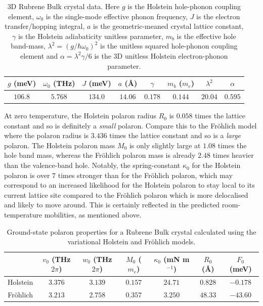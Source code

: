 \begin{table}
    \centering
    \begin{tabular}{|c|c|c|c|c|c|c|c|}
    \hline
        $g$ (meV) & $\omega_0$ (THz) & $J$ (meV) & $a$ (Å) & $\gamma$ & $m_b$ ($m_e$) & $\lambda^2$ & $\alpha$ \\
    \hline
         $106.8$ & $5.768$ & $134.0$ & $14.06$ & $0.178$ & $0.144$ & $20.04$ & $0.595$ \\
    \hline
    \end{tabular}
    \caption{3D Rubrene Bulk crystal data. Here $g$ is the Holstein hole-phonon coupling element, $\omega_0$ is the single-mode effective phonon frequency, $J$ is the electron transfer/hopping integral, $a$ is the geometric-meaned crystal lattice constant, $\gamma$ is the Holstein adiabaticity unitless parameter, $m_b$ is the effective hole band-mass, $\lambda^2 = (g / \hbar\omega_0)^2$ is the unitless squared hole-phonon coupling element and $\alpha = \lambda^2 \gamma / 6$ is the 3D unitless Holstein electron-phonon parameter.}
    \label{tab:rubrene}
\end{table}

At zero temperature, the Holstein polaron radius $R_0$ is $0.058$ times the lattice constant and so is definitely a \emph{small} polaron. Compare this to the Fr\"ohlich model where the polaron radius is $3.436$ times the lattice constant and so is a \emph{large} polaron. The Holstein polaron mass $M_0$ is only slightly large at $1.08$ times the hole band mass, whereas the Fr\"ohlich polaron mass is already $2.48$ times heavier than the valence-band hole. Notably, the spring-constant $\kappa_0$ for the Holstein polaron is over $7$ times stronger than for the Fr\"ohlich polaron, which may correspond to an increased likelihood for the Holstein polaron to stay local to its current lattice site compared to the Fr\"ohlich polaron which is more delocalised and likely to move around. This is certainly reflected in the predicted room-temperature mobilities, as mentioned above.

\begin{table}
    \centering
    \begin{tabular}{|c|c|c|c|c|c|c|}
    \hline
        & $v_0$ (THz$2\pi$) & $w_0$ (THz$2\pi$) & $M_0$ ($m_e$) &  $\kappa_0$ (mN m$^{-1}$) & $R_0$ (Å) & $F_0$ (meV) \\
    \hline
         Holstein & $3.376$ & $3.139$ & $0.157$ & $24.71$ & $0.828$ & $-0.178$ \\
    \hline
         Fr\"ohlich & $3.213$ & $2.758$ & $0.357$ & $3.250$ & $48.33$ & $-43.60$ \\
    \hline
    \end{tabular}
    \caption{Ground-state polaron properties for a Rubrene Bulk crystal calculated using the variational Holstein and Fr\"ohlich models.}
    \label{tab:rubrenegs}
\end{table}

